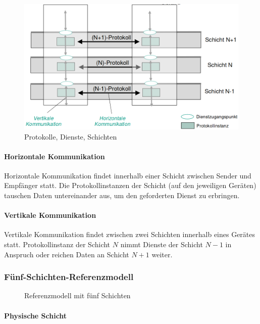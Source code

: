 \documentclass[a4paper, 14pt]{article}
\begin{document}
	\begin{figure}
		\includegraphics[width=\textwidth]{images/02-layers.png}
		\caption{Protokolle, Dienste, Schichten}
	\end{figure}

	\paragraph{Horizontale Kommunikation}

	Horizontale Kommunikation findet innerhalb einer Schicht zwischen Sender und Empfänger statt.
	Die Protokollinstanzen der Schicht (auf den jeweiligen Geräten) tauschen Daten untereinander aus, um den geforderten Dienst zu erbringen.

	\paragraph{Vertikale Kommunikation}

	Vertikale Kommunikation findet zwischen zwei Schichten innerhalb eines Gerätes statt.
	Protokollinstanz der Schicht $N$ nimmt Dienste der Schicht $N - 1$ in Anspruch oder reichen Daten an Schicht $N + 1$ weiter.

	\subsubsection{Fünf-Schichten-Referenzmodell}

	\begin{figure}
		\begin{center}
			
		\end{center}
		\caption{Referenzmodell mit fünf Schichten}
	\end{figure}

	\paragraph{Physische Schicht}
\end{document}
